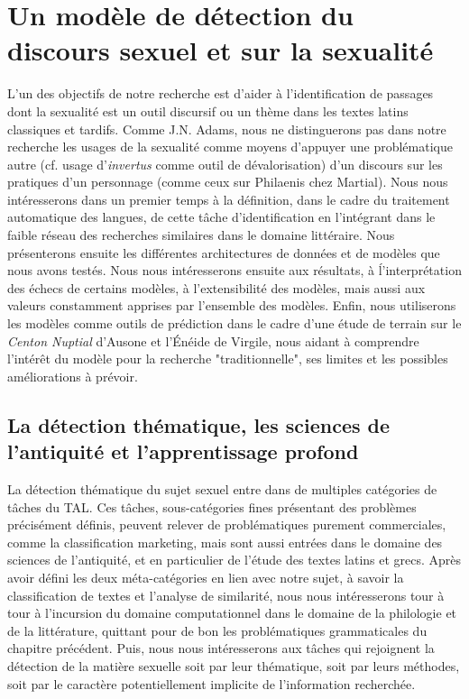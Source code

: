 \chapter{Un modèle de détection du discours sexuel et sur la sexualité}

L'un des objectifs de notre recherche est d'aider à l'identification de passages dont la sexualité est un outil discursif ou un thème dans les textes latins classiques et tardifs. Comme J.N. Adams, nous ne distinguerons pas dans notre recherche les usages de la sexualité comme moyens d'appuyer une problématique autre (cf. usage d'\textit{invertus} comme outil de dévalorisation) d'un discours sur les pratiques d'un personnage (comme ceux sur Philaenis chez Martial). Nous nous intéresserons dans un premier temps à la définition, dans le cadre du traitement automatique des langues, de cette tâche d'identification en l'intégrant dans le faible réseau des recherches similaires dans le domaine littéraire. Nous présenterons ensuite les différentes architectures de données et de modèles que nous avons testés. Nous nous intéresserons ensuite aux résultats, à ĺ'interprétation des échecs de certains modèles, à l'extensibilité des modèles, mais aussi aux valeurs constamment apprises par l'ensemble des modèles. Enfin, nous utiliserons les modèles comme outils de prédiction dans le cadre d'une étude de terrain sur le \textit{Centon Nuptial} d'Ausone et l'Énéide de Virgile, nous aidant à comprendre l'intérêt du modèle pour la recherche "traditionnelle", ses limites et les possibles améliorations à prévoir.

\section{La détection thématique, les sciences de l'antiquité et l'apprentissage profond}


La détection thématique du sujet sexuel entre dans de multiples catégories de tâches du TAL. Ces tâches, sous-catégories fines présentant des problèmes précisément définis, peuvent relever de problématiques purement commerciales, comme la classification marketing, mais sont aussi entrées dans le domaine des sciences de l'antiquité, et en particulier de l'étude des textes latins et grecs. Après avoir défini les deux méta-catégories en lien avec notre sujet, à savoir la classification de textes et l'analyse de similarité, nous nous intéresserons tour à tour à l'incursion du domaine computationnel dans le domaine de la philologie et de la littérature, quittant pour de bon les problématiques grammaticales du chapitre précédent. Puis, nous nous intéresserons aux tâches qui rejoignent la détection de la matière sexuelle soit par leur thématique, soit par leurs méthodes, soit par le caractère potentiellement implicite de l'information recherchée.

